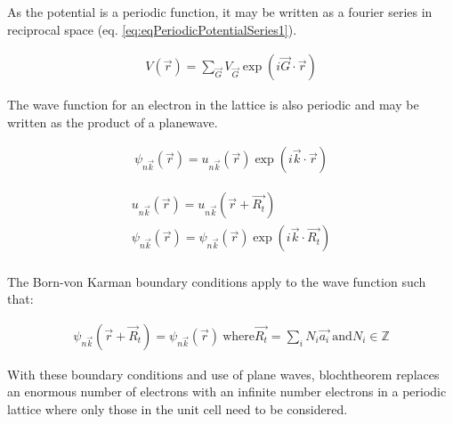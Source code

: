 As the potential is a periodic function, it may be written as a fourier series in reciprocal space (eq. \ref{eq:eqPeriodicPotentialSeries1}).

\begin{equation}
  \begin{split}
    V(\vec{r}) = \sum_{\vec{G}} V_{\vec{G}} \exp(i \vec{G} \cdot \vec{r})
  \end{split}
  \label{eq:eqPeriodicPotentialSeries1}
\end{equation}

The wave function for an electron in the lattice is also periodic and may be written as the product of a \gls{planewave}.   

\begin{equation}
  \begin{split}
    \psi_{n\vec{k}} (\vec{r}) = u_{n\vec{k}}(\vec{r}) \exp(i \vec{k} \cdot \vec{r})
  \end{split}
  \label{eq:eqPeriodicPotentialSeries2}
\end{equation}

\begin{equation}
  \begin{split}
    u_{n\vec{k}}(\vec{r}) = u_{n\vec{k}}(\vec{r} + \vec{R_{t}}) \\
     \psi_{n\vec{k}} (\vec{r}) = \psi_{n\vec{k}} (\vec{r}) \exp(i \vec{k} \cdot \vec{R_{t}}) \\
  \end{split}
  \label{eq:eqPeriodicPotentialSeries3}
\end{equation}

The Born-von Karman boundary conditions apply to the wave function such that:

\begin{equation}
  \begin{split}
    \psi_{n\vec{k}} (\vec{r} + \vec{R}_{t}) = \psi_{n\vec{k}} (\vec{r}) \
    \text{where} \vec{R_t} = \sum_i N_i \vec{a_i} \
    \text{and} N_i \in \mathbb{Z}
  \end{split}
  \label{eq:eqPeriodicPotentialSeries4}
\end{equation}

With these boundary conditions and use of plane waves, \Gls{blochtheorem} replaces an enormous number of electrons with an infinite number electrons in a periodic lattice where only those in the unit cell need to be considered.

